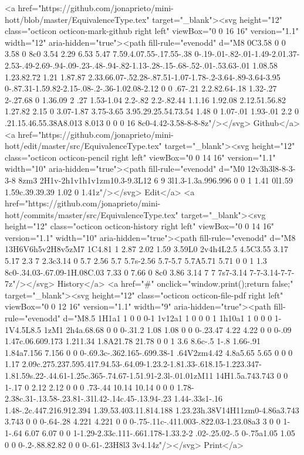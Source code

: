       <a href="https://github.com/jonaprieto/mini-hott/blob/master/EquivalenceType.tex" target="_blank"><svg height="12" class="octicon octicon-mark-github right left" viewBox="0 0 16 16" version="1.1" width="12" aria-hidden="true"><path fill-rule="evenodd" d="M8 0C3.58 0 0 3.58 0 8c0 3.54 2.29 6.53 5.47 7.59.4.07.55-.17.55-.38 0-.19-.01-.82-.01-1.49-2.01.37-2.53-.49-2.69-.94-.09-.23-.48-.94-.82-1.13-.28-.15-.68-.52-.01-.53.63-.01 1.08.58 1.23.82.72 1.21 1.87.87 2.33.66.07-.52.28-.87.51-1.07-1.78-.2-3.64-.89-3.64-3.95 0-.87.31-1.59.82-2.15-.08-.2-.36-1.02.08-2.12 0 0 .67-.21 2.2.82.64-.18 1.32-.27 2-.27.68 0 1.36.09 2 .27 1.53-1.04 2.2-.82 2.2-.82.44 1.1.16 1.92.08 2.12.51.56.82 1.27.82 2.15 0 3.07-1.87 3.75-3.65 3.95.29.25.54.73.54 1.48 0 1.07-.01 1.93-.01 2.2 0 .21.15.46.55.38A8.013 8.013 0 0 0 16 8c0-4.42-3.58-8-8-8z"/></svg> Github</a>
      <a href="https://github.com/jonaprieto/mini-hott/edit/master/src/EquivalenceType.tex" target="_blank"><svg height="12" class="octicon octicon-pencil right left" viewBox="0 0 14 16" version="1.1" width="10" aria-hidden="true"><path fill-rule="evenodd" d="M0 12v3h3l8-8-3-3-8 8zm3 2H1v-2h1v1h1v1zm10.3-9.3L12 6 9 3l1.3-1.3a.996.996 0 0 1 1.41 0l1.59 1.59c.39.39.39 1.02 0 1.41z"/></svg> Edit</a>
      <a href="https://github.com/jonaprieto/mini-hott/commits/master/src/EquivalenceType.tex" target="_blank"><svg height="12" class="octicon octicon-history right left" viewBox="0 0 14 16" version="1.1" width="10" aria-hidden="true"><path fill-rule="evenodd" d="M8 13H6V6h5v2H8v5zM7 1C4.81 1 2.87 2.02 1.59 3.59L0 2v4h4L2.5 4.5C3.55 3.17 5.17 2.3 7 2.3c3.14 0 5.7 2.56 5.7 5.7s-2.56 5.7-5.7 5.7A5.71 5.71 0 0 1 1.3 8c0-.34.03-.67.09-1H.08C.03 7.33 0 7.66 0 8c0 3.86 3.14 7 7 7s7-3.14 7-7-3.14-7-7-7z"/></svg> History</a>
      <a  href="#" onclick="window.print();return false;" target="_blank"><svg height="12" class="octicon octicon-file-pdf right left" viewBox="0 0 12 16" version="1.1" width="9" aria-hidden="true"><path fill-rule="evenodd" d="M8.5 1H1a1 1 0 0 0-1 1v12a1 1 0 0 0 1 1h10a1 1 0 0 0 1-1V4.5L8.5 1zM1 2h4a.68.68 0 0 0-.31.2 1.08 1.08 0 0 0-.23.47 4.22 4.22 0 0 0-.09 1.47c.06.609.173 1.211.34 1.8A21.78 21.78 0 0 1 3.6 8.6c-.5 1-.8 1.66-.91 1.84a7.156 7.156 0 0 0-.69.3c-.362.165-.699.38-1 .64V2zm4.42 4.8a5.65 5.65 0 0 0 1.17 2.09c.275.237.595.417.94.53-.64.09-1.23.2-1.81.33-.618.15-1.223.347-1.81.59s.22-.44.61-1.25c.365-.74.67-1.51.91-2.3l-.01.01zM11 14H1.5a.743.743 0 0 1-.17 0 2.12 2.12 0 0 0 .73-.44 10.14 10.14 0 0 0 1.78-2.38c.31-.13.58-.23.81-.31l.42-.14c.45-.13.94-.23 1.44-.33s1-.16 1.48-.2c.447.216.912.394 1.39.53.403.11.814.188 1.23.23h.38V14H11zm0-4.86a3.743 3.743 0 0 0-.64-.28 4.221 4.221 0 0 0-.75-.11c-.411.003-.822.03-1.23.08a3 3 0 0 1-1-.64 6.07 6.07 0 0 1-1.29-2.33c.111-.661.178-1.33.2-2 .02-.25.02-.5 0-.75a1.05 1.05 0 0 0-.2-.88.82.82 0 0 0-.61-.23H8l3 3v4.14z"/></svg> Print</a>
